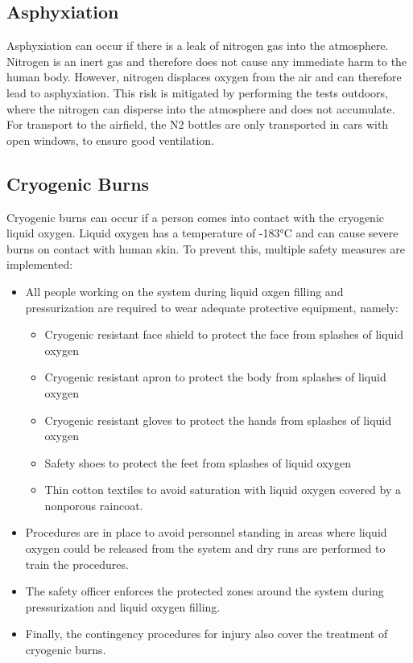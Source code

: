 \documentclass{article}
\begin{document}
\subsection{Asphyxiation}
Asphyxiation can occur if there is a leak of nitrogen gas into the atmosphere. Nitrogen is an inert gas and therefore does not cause any immediate harm to the human body. However, nitrogen displaces oxygen from the air and can therefore lead to asphyxiation. This risk is mitigated by performing the tests outdoors, where the nitrogen can disperse into the atmosphere and does not accumulate. For transport to the airfield, the N2 bottles are only transported in cars with open windows, to ensure good ventilation. 
\subsection{Cryogenic Burns}
Cryogenic burns can occur if a person comes into contact with the cryogenic liquid oxygen. Liquid oxygen has a temperature of -183°C and can cause severe burns on contact with human skin. To prevent this, multiple safety measures are implemented:
\begin{itemize}
    \item All people working on the system during liquid oxgen filling and pressurization are required to wear adequate protective equipment, namely:
    \begin{itemize}
        \item Cryogenic resistant face shield to protect the face from splashes of liquid oxygen
        \item Cryogenic resistant apron to protect the body from splashes of liquid oxygen
        \item Cryogenic resistant gloves to protect the hands from splashes of liquid oxygen
        \item Safety shoes to protect the feet from splashes of liquid oxygen
        \item Thin cotton textiles to avoid saturation with liquid oxygen covered by a nonporous raincoat.
    \end{itemize}
    \item Procedures are in place to avoid personnel standing in areas where liquid oxygen could be released from the system and dry runs are performed to train the procedures.
    \item The safety officer enforces the protected zones around the system during pressurization and liquid oxygen filling.
    \item Finally, the contingency procedures for injury also cover the treatment of cryogenic burns.
\end{itemize}
\end{document}
